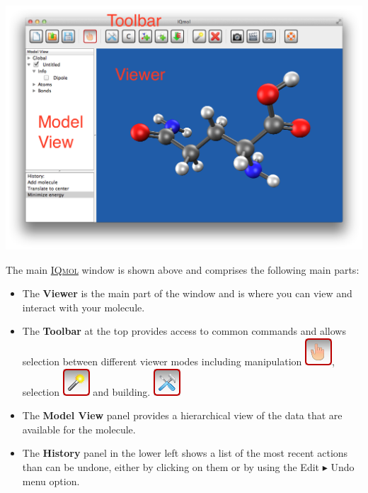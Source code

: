 \documentclass[a4paper,12pt]{article}
\newcommand{\iqmol}{\href{http://iqmol.org}{{\scshape IQmol}}}
\begin{document}
\begin{center}
\includegraphics[scale=0.40]{figures/Viewer.png}
\end{center}

The main \iqmol{} window is shown above and comprises the following main parts:
\begin{itemize}
\item The {\bf Viewer} is the main part of the window and is where you can
      view and interact with your molecule.
\item The {\bf Toolbar} at the top provides access to common commands and allows selection
      between different viewer modes including manipulation 
      \includegraphics[scale=0.40]{figures/ManipulateButton.png}, selection 
      \includegraphics[scale=0.40]{figures/SelectButton.png} and building.
      \includegraphics[scale=0.40]{figures/BuildButton.png}
\item The {\bf Model View} panel provides a hierarchical view of the data that
      are available for the molecule.
\item The {\bf History} panel in the lower left shows a list of the most recent
      actions than can be undone, either by clicking on them or by using the
      Edit $\blacktriangleright$ Undo menu option. 
\end{itemize}
\end{document}
